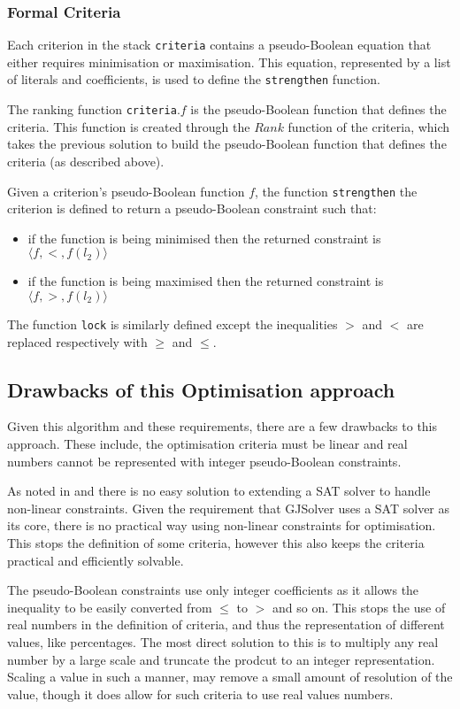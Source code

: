 \subsubsection{Formal Criteria}
Each criterion in the stack \verb+criteria+ contains a pseudo-Boolean equation that either requires minimisation or maximisation.
This equation, represented by a list of literals and coefficients, is used to define the \verb+strengthen+ function.

The ranking function \verb+criteria+.$f$ is the pseudo-Boolean function that defines the criteria.
This function is created through the $Rank$ function of the criteria, which takes the previous solution to build the pseudo-Boolean function that defines the criteria (as described above).

Given a criterion's pseudo-Boolean function $f$,
the function \verb+strengthen+ the criterion is defined to return a pseudo-Boolean constraint such that:
\begin{itemize}
  \item if the function is being minimised then the returned constraint is $\langle f,<,f(l_2) \rangle$
  \item if the function is being maximised then the returned constraint is $\langle f,>,f(l_2) \rangle$
\end{itemize}
The function \verb+lock+ is similarly defined except the inequalities $>$ and $<$ are replaced respectively with $\geq$ and $\leq$.

\subsection{Drawbacks of this Optimisation approach}
Given this algorithm and these requirements, there are a few drawbacks to this approach.
These include, the optimisation criteria must be linear and real numbers cannot be represented with integer pseudo-Boolean constraints.

As noted in \citep{le_berre_dependency_2009} and \citep{leBerre2010} there is no easy solution to extending a SAT solver to handle non-linear constraints.
Given the requirement that GJSolver uses a SAT solver as its core, there is no practical way using non-linear constraints for optimisation.
This stops the definition of some criteria, however this also keeps the criteria practical and efficiently solvable.   

The pseudo-Boolean constraints use only integer coefficients as it allows the inequality to be easily converted from $\leq$ to $>$ and so on.
This stops the use of real numbers in the definition of criteria, and thus the representation of different values, like percentages.
The most direct solution to this is to multiply any real number by a large scale and truncate the prodcut to an integer representation.
Scaling a value in such a manner, may remove a small amount of resolution of the value, though it does allow for such criteria to use real values numbers.

